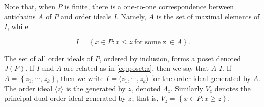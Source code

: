 
Note that, when $P$ is finite, there is a one-to-one correspondence between antichains $A$ of $P$ and order ideals $I$. Namely, $A$ is the set of maximal elements of $I$, while

\begin{equation}
\label{eq:poset:a}
I = \left\{{x \in P : x \le z ~\text{for some z}~ \in A}\right\}.
\end{equation}

The set of all order ideals of $P$, ordered by inclusion, forms a poset denoted $J(P)$. If $I$ and $A$ are related as in \ref{eq:poset:a}, then we say that $A$  $I$. If $A = \left\{{z_1 , \cdots , z_k}\right\}$, then we write $I = \langle z_1 , \cdots , z_k \rangle$ for the order ideal generated by $A$. The order ideal $\langle z \rangle$ is the  generated by $z$, denoted $\Lambda_z$. Similarly $V_z$ denotes the principal dual order ideal generated by $z$, that is, $V_z = \left\{{x \in P : x \ge z}\right\}$.

